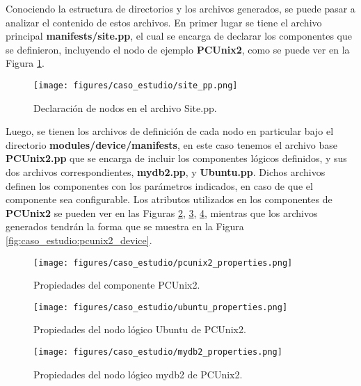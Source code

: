 Conociendo la estructura de directorios y los archivos generados, se puede pasar a analizar el contenido de estos archivos. En primer lugar se tiene el archivo principal \textbf{manifests/site.pp}, el cual se encarga de declarar los componentes que se definieron, incluyendo el nodo de ejemplo \textbf{PCUnix2}, como se puede ver en la Figura \ref{fig:caso_estudio:site_pp}.

\begin{figure}[htbp]
    \centering
    \texttt{[image: figures/caso\_estudio/site\_pp.png]}
    \caption{Declaración de nodos en el archivo Site.pp.}
    \label{fig:caso_estudio:site_pp}
\end{figure}

Luego, se tienen los archivos de definición de cada nodo en particular bajo el directorio \textbf{modules/device/manifests}, en este caso tenemos el archivo base \textbf{PCUnix2.pp} que se encarga de incluir los componentes lógicos definidos, y sus dos archivos correspondientes, \textbf{mydb2.pp}, y \textbf{Ubuntu.pp}. Dichos archivos definen los componentes con los parámetros indicados, en caso de que el componente sea configurable. Los atributos utilizados en los componentes de \textbf{PCUnix2} se pueden ver en las Figuras \ref{fig:caso_estudio:pcunix2_prop}, \ref{fig:caso_estudio:ubuntu_prop}, \ref{fig:caso_estudio:mydb2_prop}, mientras que los archivos generados tendrán la forma que se muestra en la Figura \ref{fig:caso_estudio:pcunix2_device}.

\begin{figure}[htbp]
    \centering
    \texttt{[image: figures/caso\_estudio/pcunix2\_properties.png]}
    \caption{Propiedades del componente PCUnix2.}
    \label{fig:caso_estudio:pcunix2_prop}
\end{figure}

\begin{figure}[htbp]
    \centering
    \texttt{[image: figures/caso\_estudio/ubuntu\_properties.png]}
    \caption{Propiedades del nodo lógico Ubuntu de PCUnix2.}
    \label{fig:caso_estudio:ubuntu_prop}
\end{figure}

\begin{figure}[htbp]
    \centering
    \texttt{[image: figures/caso\_estudio/mydb2\_properties.png]}
    \caption{Propiedades del nodo lógico mydb2 de PCUnix2.}
    \label{fig:caso_estudio:mydb2_prop}
\end{figure}

